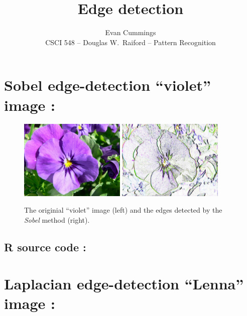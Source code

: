 


\footnotesize

\title{Edge detection}
\author{Evan Cummings\\
CSCI 548 -- Douglas W.~Raiford -- Pattern Recognition}

\maketitle

\section{Sobel edge-detection ``violet'' image :}

\begin{figure}[H]
  \centering
    \includegraphics[width=0.45\textwidth]{images/violet.jpg}
    \quad
    \includegraphics[width=0.45\textwidth]{images/violet_sobel.jpeg}
  \caption{The originial ``violet'' image (left) and the edges detected by the \emph{Sobel} method (right).}
\end{figure}

\subsection{R source code :}


\section{Laplacian edge-detection ``Lenna'' image :}


